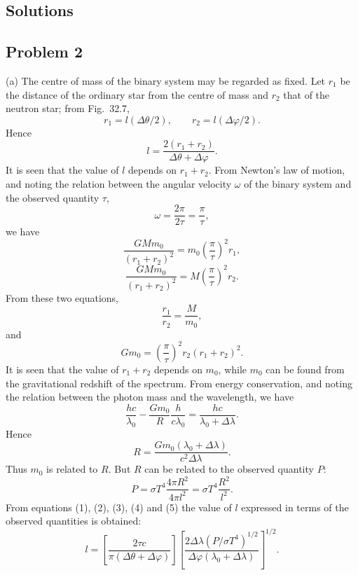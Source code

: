 \subsection*{Solutions}

\subsection*{Problem 2}

(a) The centre of mass of the binary system may be regarded as fixed. Let $r_1$ be the distance of the ordinary star from the centre of mass and $r_2$ that of the neutron star; from Fig.~32.7,
\begin{equation}
r_1=l(\Delta\theta/2),\qquad r_2=l(\Delta\varphi/2). \tag{1}
\end{equation}
Hence
\begin{equation}
l=\frac{2(r_1+r_2)}{\Delta\theta+\Delta\varphi}. \tag{2}
\end{equation}
It is seen that the value of $l$ depends on $r_1+r_2$. From Newton's law of motion, and noting the relation between the angular velocity $\omega$ of the binary system and the observed quantity $\tau$,
\[
\omega=\frac{2\pi}{2\tau}=\frac{\pi}{\tau},
\]
we have
\[
\frac{GMm_0}{(r_1+r_2)^2}=m_0\left(\frac{\pi}{\tau}\right)^2r_1,
\]
\[
\frac{GMm_0}{(r_1+r_2)^2}=M\left(\frac{\pi}{\tau}\right)^2r_2.
\]
From these two equations,
\[
\frac{r_1}{r_2}=\frac{M}{m_0},
\]
and
\begin{equation}
Gm_0=\left(\frac{\pi}{\tau}\right)^2r_2(r_1+r_2)^2. \tag{3}
\end{equation}
It is seen that the value of $r_1+r_2$ depends on $m_0$, while $m_0$ can be found from the gravitational redshift of the spectrum. From energy conservation, and noting the relation between the photon mass and the wavelength, we have
\[
\frac{hc}{\lambda_0}-\frac{Gm_0}{R}\frac{h}{c\lambda_0}=\frac{hc}{\lambda_0+\Delta\lambda}.
\]
Hence
\begin{equation}
R=\frac{Gm_0(\lambda_0+\Delta\lambda)}{c^2\Delta\lambda}. \tag{4}
\end{equation}
Thus $m_0$ is related to $R$. But $R$ can be related to the observed quantity $P$:
\begin{equation}
P=\sigma T^4\frac{4\pi R^2}{4\pi l^2}=\sigma T^4\frac{R^2}{l^2}. \tag{5}
\end{equation}
From equations (1), (2), (3), (4) and (5) the value of $l$ expressed in terms of the observed quantities is obtained:
\begin{equation}
l=\left[\frac{2\tau c}{\pi(\Delta\theta+\Delta\varphi)}\right]
\left[\frac{2\Delta\lambda(P/\sigma T^4)^{1/2}}{\Delta\varphi(\lambda_0+\Delta\lambda)}\right]^{1/2}. \tag{6}
\end{equation}

